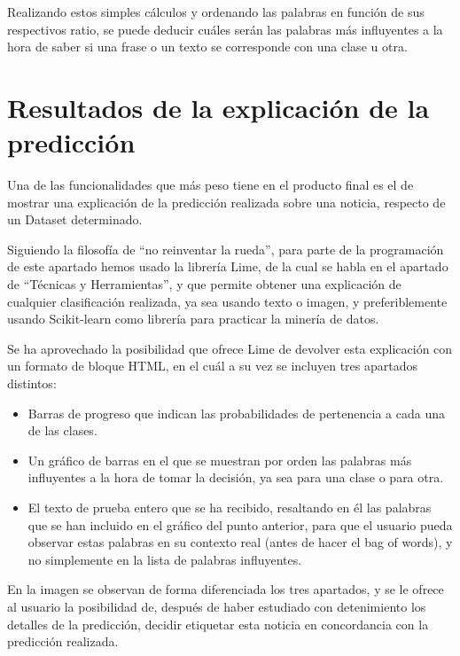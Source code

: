 Realizando estos simples cálculos y ordenando las palabras en función de sus respectivos ratio, se puede deducir cuáles serán las palabras más influyentes a la hora de saber si una frase o un texto se corresponde con una clase u otra.

\section{Resultados de la explicación de la predicción}

Una de las funcionalidades que más peso tiene en el producto final es el de mostrar una explicación de la predicción realizada sobre una noticia, respecto de un Dataset determinado. 

Siguiendo la filosofía de ``no reinventar la rueda'', para parte de la programación de este apartado hemos usado la librería Lime, de la cual se habla en el apartado de ``Técnicas y Herramientas'', y que permite obtener una explicación de cualquier clasificación realizada, ya sea usando texto o imagen, y preferiblemente usando Scikit-learn como librería para practicar la minería de datos.

Se ha aprovechado la posibilidad que ofrece Lime de devolver esta explicación con un formato de bloque HTML, en el cuál a su vez se incluyen tres apartados distintos:

\begin{itemize}

\item Barras de progreso que indican las probabilidades de pertenencia a cada una de las clases.

\item Un gráfico de barras en el que se muestran por orden las palabras más influyentes a la hora de tomar la decisión, ya sea para una clase o para otra.

\item El texto de prueba entero que se ha recibido, resaltando en él las palabras que se han incluido en el gráfico del punto anterior, para que el usuario pueda observar estas palabras en su contexto real (antes de hacer el bag of words), y no simplemente en la lista de palabras influyentes.

\end{itemize}


En la imagen se observan de forma diferenciada los tres apartados, y se le ofrece al usuario la posibilidad de, después de haber estudiado con detenimiento los detalles de la predicción, decidir etiquetar esta noticia en concordancia con la predicción realizada.


